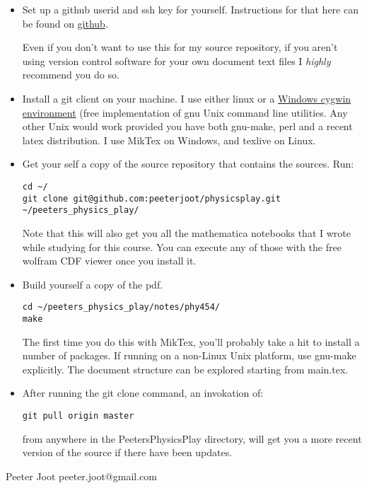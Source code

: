 \begin{itemize}
\item Set up a github userid and ssh key for yourself.  Instructions for that here can be found on \href{http://help.github.com/win-set-up-git/}{github}.

Even if you don't want to use this for my source repository, if you aren't using version control software for your own document text files I \textit{highly} recommend you do so.

\item Install a git client on your machine.  I use either linux or a \href{http://www.cygwin.com/}{Windows cygwin environment} (free implementation of gnu Unix command line utilities.  Any other Unix would work provided you have both gnu-make, perl and a recent latex distribution.  I use MikTex on Windows, and texlive on Linux.

\item Get your self a copy of the source repository that contains the sources.  Run:

\begin{lstlisting}
cd ~/
git clone git@github.com:peeterjoot/physicsplay.git ~/peeters_physics_play/
\end{lstlisting}

Note that this will also get you all the mathematica notebooks that I wrote while studying for this course.  You can execute any of those with the free wolfram CDF viewer once you install it.

\item Build yourself a copy of the pdf.

\begin{lstlisting}
cd ~/peeters_physics_play/notes/phy454/
make
\end{lstlisting}

The first time you do this with MikTex, you'll probably take a hit to install a number of packages.  If running on a non-Linux Unix platform, use gnu-make explicitly.  The document structure can be explored starting from main.tex.

\item After running the git clone command, an invokation of:

\begin{lstlisting}
git pull origin master
\end{lstlisting}

from anywhere in the PeetersPhysicsPlay directory, will get you a more recent version of the source if there have been updates.
\end{itemize}

Peeter Joot  \quad peeter.joot@gmail.com 


